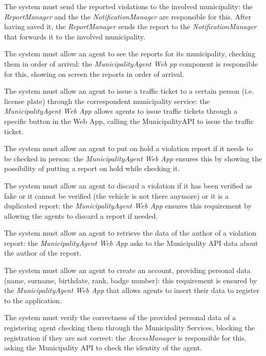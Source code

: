 \documentclass[a4paper]{report}
\begin{document}
\begin{enumerate}[start=1,label={[R\arabic*]}]
\item \label{[R18]}The system must send the reported violations to the involved municipality: the \textit{ReportManager} and the the \textit{NotificationManager} are responsible for this. After having saved it, the \textit{ReportManager} sends the report to the \textit{NotificationManager} that forwards it to the involved municipality.
\item \label{[R19]}The system must allow an agent to see the reports for its municipality, checking them in order of arrival: the \textit{MunicipalityAgent Web pp} component is responsible for this, showing on screen the reports in order of arrival.
\item \label{[R20]}The system must allow an agent to issue a traffic ticket to a certain person (i.e. license plate) through the correspondent municipality service: the \textit{MunicipalityAgent Web App}  allows agents to issue traffic tickets through a specific button in the Web App, calling the MunicipalityAPI to issue the traffic ticket.
\item \label{[R21]}The system must allow an agent to put on hold a violation report if it needs to be checked in person: the \textit{MunicipalityAgent Web App} ensures this by showing the possibility of putting a report on hold while checking it.
\item \label{[R22]}The system must allow an agent to discard a violation if it has been verified as fake or it cannot be verified (the vehicle is not there anymore) or it is a duplicated report: the \textit{MunicipalityAgent Web App} ensures this requirement by allowing the agents to discard a report if needed.
\item \label{[R23]}The system must allow an agent to retrieve the data of the author of a violation report: the \textit{MunicipalityAgent Web App} asks to the Municipality API data about the author of the report. 
\item \label{[R24]}The system must allow an agent to create an account, providing personal data (name, surname, birthdate, rank, badge number): this requirement is ensured by the \textit{MunicipalityAgent Web App} that allows agents to insert their data to register to the application.
\item \label{[R25]}The system must verify the correctness of the provided personal data of a registering agent checking them through the Municipality Services, blocking the registration if they are not correct: the \textit{AccessManager} is responsible for this, asking the Municipality API to check the identity of the agent.

\end{enumerate}
\end{document}
